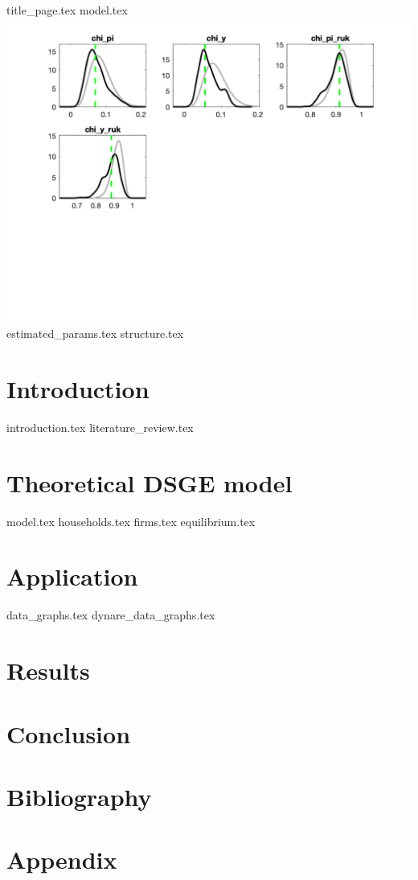 \documentclass[12pt]{article}
\begin{document}
\begin{sloppypar}
{title_page.tex}
{model.tex}
\includegraphics[scale=0.5]{./Graphs/Priors_Posteriors.png}
{estimated_params.tex}
\pagebreak
{structure.tex}
\pagebreak
{}
\section{Introduction}
{introduction.tex}
{literature_review.tex}

\section{Theoretical DSGE model}
{model.tex}
{households.tex}
{firms.tex}
{equilibrium.tex}
\section{Application} \label{application}
{data_graphs.tex}
{dynare_data_graphs.tex}
\section{Results}
\section{Conclusion}
\section{Bibliography}
\printbibliography
\section{Appendix}
\end{sloppypar}
\end{document}
